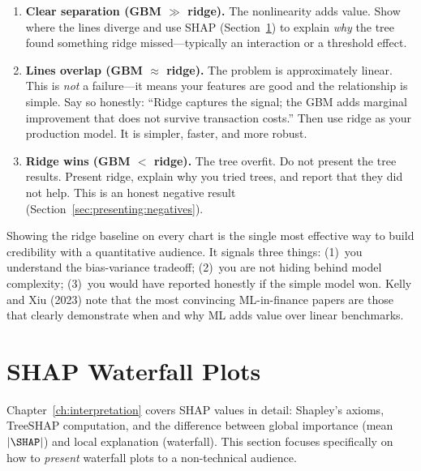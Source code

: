\begin{enumerate}[leftmargin=1.5em]
  \item \textbf{Clear separation (GBM $\gg$ ridge).}  The nonlinearity
    adds value.  Show where the lines diverge and use SHAP
    (Section~\ref{sec:presenting:shap}) to explain \emph{why} the tree
    found something ridge missed---typically an interaction or a threshold
    effect.
  \item \textbf{Lines overlap (GBM $\approx$ ridge).}  The problem is
    approximately linear.  This is \emph{not} a failure---it means your
    features are good and the relationship is simple.  Say so honestly:
    ``Ridge captures the signal; the GBM adds marginal improvement that
    does not survive transaction costs.''  Then use ridge as your
    production model.  It is simpler, faster, and more robust.
  \item \textbf{Ridge wins (GBM $<$ ridge).}  The tree overfit.  Do
    not present the tree results.  Present ridge, explain why you tried
    trees, and report that they did not help.  This is an honest negative
    result (Section~\ref{sec:presenting:negatives}).
\end{enumerate}

\begin{keyidea}
Showing the ridge baseline on every chart is the single most effective
way to build credibility with a quantitative audience.  It signals three
things: (1)~you understand the bias-variance tradeoff; (2)~you are not
hiding behind model complexity; (3)~you would have reported honestly if
the simple model won.  Kelly and Xiu (2023) note that the most
convincing ML-in-finance papers are those that clearly demonstrate when
and why ML adds value over linear benchmarks.
\end{keyidea}

\section{SHAP Waterfall Plots}
\label{sec:presenting:shap}

\begin{prereq}
Chapter~\ref{ch:interpretation} covers SHAP values in detail:
Shapley's axioms, TreeSHAP computation, and the difference between
global importance (mean $|\SHAP|$) and local explanation (waterfall).
This section focuses specifically on how to \emph{present} waterfall
plots to a non-technical audience.
\end{prereq}

